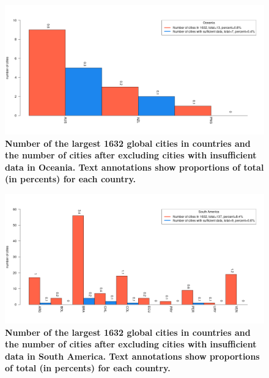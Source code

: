\documentclass[preprint,10pt]{elsarticle} %
\begin{document}
{\begin{figure}
\centering
\includegraphics[trim={ 0 35 25 50 },clip,scale=0.45]{Images2/Oceania_cities_Rev2.png}
\caption{\bf Number of the largest 1632 global cities in countries and the number of cities after excluding cities with insufficient data in Oceania. Text annotations show proportions of total (in percents) for each country.}
 \label{fig:oceania}
\end{figure}

\begin{figure}
\centering
\includegraphics[trim={ 0 35 25 50 },clip,scale=0.45]{Images2/South America_cities_Rev2.png}
\caption{\bf Number of the largest 1632 global cities in countries and the number of cities after excluding cities with insufficient data in South America. Text annotations show proportions of total (in percents) for each country.}
 \label{fig:southhamerica}
\end{figure}

} %
\end{document}
